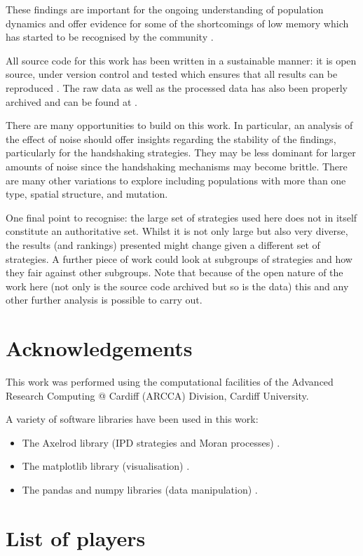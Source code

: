 \documentclass[10pt,journal]{IEEEtran}
\begin{document}
These findings are important for the ongoing understanding of
population dynamics and offer evidence for some of the shortcomings of low
memory which has started to be recognised by the community \cite{Hilbe2017}.

All source code for this work has been written in a sustainable manner: it is
open source, under version control and tested which ensures that all results can
be reproduced \cite{Prlic2012, Sandve2013, Wilson2014}. The raw data as well as
the processed data has also been properly archived and can be found
at \cite{data}.

There are many opportunities to build on this work. In particular, an analysis
of the effect of noise should offer insights regarding the stability of the findings,
particularly for the handshaking strategies. They may be less dominant for
larger amounts of noise since the handshaking mechanisms may become brittle.
There are many other variations to explore including populations with more
than one type, spatial structure, and mutation.

One final point to recognise: the large set of strategies used here does not in
itself constitute an authoritative set. Whilst it is not only large but also very
diverse, the results (and rankings) presented might change given a different set
of strategies. A further piece of work could look at subgroups of strategies and
how they fair against other subgroups. Note that because of the open nature of
the work here (not only is the source code archived but so is the data) this and
any other further analysis is possible to carry out.


\section*{Acknowledgements}

This work was performed using the computational facilities of the Advanced
Research Computing @ Cardiff (ARCCA) Division, Cardiff University.

A variety of software libraries have been used in this work:

\begin{itemize}
    \item The Axelrod library (IPD strategies and Moran processes)
        \cite{axelrodproject}.
    \item The matplotlib library (visualisation) \cite{hunter2007matplotlib}.
    \item The pandas and numpy libraries (data manipulation)
        \cite{mckinney2010data, walt2011numpy}.
\end{itemize}

\newpage



\appendix

\section{List of players}\label{app:list_of_players}

\footnotesize
\begin{enumerate}
    
\end{enumerate}
\end{document}
